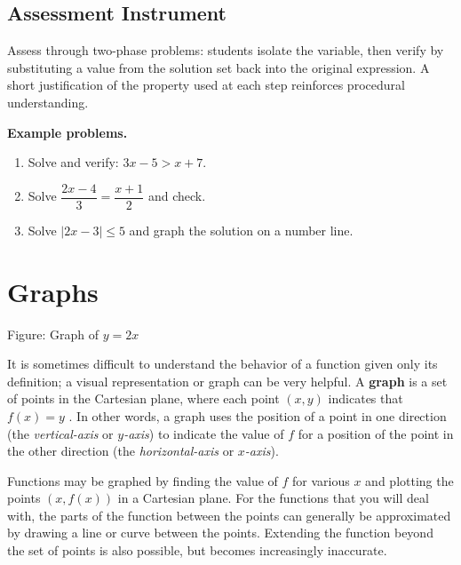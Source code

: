 \subsection{Assessment Instrument}
\label{ssec:asse-3669}


Assess through two-phase problems: students isolate the variable, then
verify by substituting a value from the solution set back into the original
expression. A short justification of the property used at each step
reinforces procedural understanding.

\textbf{Example problems.}
\begin{enumerate}
    \item Solve and verify: $3x - 5 > x + 7$.
    \item Solve $\dfrac{2x-4}{3} = \dfrac{x+1}{2}$ and check.
    \item Solve $|2x - 3| \leq 5$ and graph the solution on a number line.
\end{enumerate}



\section{Graphs}
\label{sec:grap-e870}





Figure: Graph of $y=2x$



It is sometimes difficult to understand the behavior of a function given only its
definition; a visual representation or graph can be very helpful. A \textbf{graph} is a
set of points in the Cartesian plane, where each point $(x,y)$ indicates that $f(x)=y$ .
In other words, a graph uses the position of a point in one direction (the
\textit{vertical-axis} or $y$\textit{-axis}) to indicate the value of $f$ for a position
of the point in the other direction (the \textit{horizontal-axis} or $x$\textit{-axis}).



Functions may be graphed by finding the value of $f$ for various $x$ and plotting the
points $(x,f(x))$ in a Cartesian plane. For the functions that you will deal with, the
parts of the function between the points can generally be approximated by drawing a line
or curve between the points. Extending the function beyond the set of points is also
possible, but becomes increasingly inaccurate.




